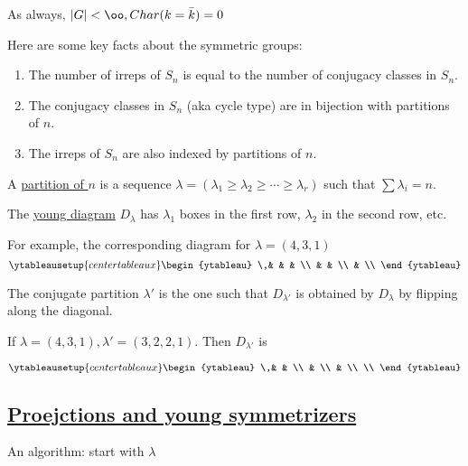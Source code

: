 \documentclass[x11names,reqno,14pt]{extarticle}
\newcommand{\bark}{\bar{k}}
\begin{document}
As always, $|G|<\oo, Char (k = \bark) = 0$

Here are some key facts about the symmetric groups: 
\begin{enumerate}

\item The number of irreps of $S_n$ is equal to the number of conjugacy classes in $S_n$. 

\item The conjugacy classes in $S_n$ (aka cycle type) are in bijection with partitions of $n$. 

\item The irreps of $S_n$ are also indexed by partitions of $n$. 

\end{enumerate}


A \underline{partition of $n$} is a sequence $\lambda = (\lambda_1 \geq \lambda_2 \geq \cdots \geq \lambda_r)$ such that $\sum\lambda_i = n$. 


The \underline{young diagram} $D_\lambda$ has $\lambda_1$ boxes in the first row, $\lambda_2$ in the second row, etc.

For example, the corresponding diagram for $\lambda = (4,3,1)$ 
\[
\ytableausetup{centertableaux}
\begin{ytableau}
\,& & & \\
& &  \\
& \\
\end{ytableau}
\]

The conjugate partition $\lambda'$  is the one such that $D_{\lambda'}$ is obtained by $D_\lambda$ by flipping along the diagonal. 

If $\lambda = (4,3,1), \lambda' = (3,2,2,1)$. Then $D_{\lambda'}$ is

\[
\ytableausetup{centertableaux}
\begin{ytableau}
\,& & \\
& \\
& \\
\\
\end{ytableau}
\]

\subsection*{\underline{Proejctions and young symmetrizers}}

An algorithm: start with $\lambda$
\end{document}
